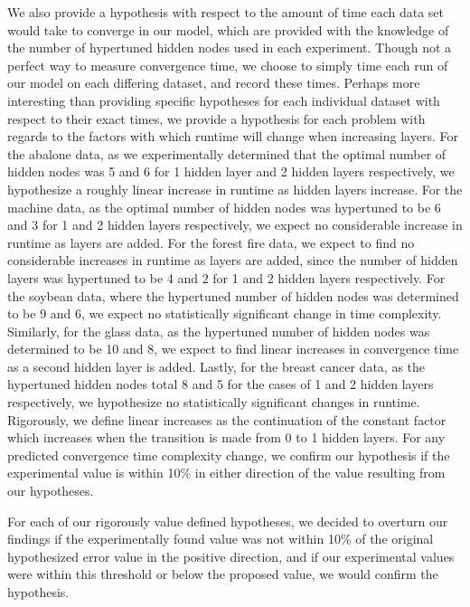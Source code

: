 \documentclass[twoside,11pt]{article}
\begin{document}
  We also provide a hypothesis with respect to the amount of time each data set would take to converge in our model, which are provided with the knowledge of
  the number of hypertuned hidden nodes used in each experiment. 
  Though not a perfect way to measure
  convergence time, we choose to simply time each run of our model on each differing dataset, and record these times. Perhaps more interesting than providing
  specific hypotheses for each individual dataset with respect to their exact times, we provide a hypothesis for each problem with regards to the factors with
  which runtime will change when increasing layers. For the abalone data, as we experimentally determined that the optimal number of hidden nodes was 5 and 6 for
  1 hidden layer and 2 hidden layers respectively, we hypothesize a roughly linear increase in runtime as hidden layers increase. For the machine data, as the optimal
  number of hidden nodes was hypertuned to be 6 and 3 for 1 and 2 hidden layers respectively, we expect no considerable increase in runtime as layers are added. For
  the forest fire data, we expect to find no considerable increases in runtime as layers are added, since the number of hidden layers was hypertuned to be
  4 and 2 for 1 and 2 hidden layers respectively. For the soybean data, where the hypertuned number of hidden nodes was determined to be 9 and 6, we expect no 
  statistically significant change in time complexity. Similarly, for the glass data, as the hypertuned number of hidden nodes was determined to be 10 and 8,
  we expect to find linear increases in convergence time as a second hidden layer is added. 
  Lastly, for the breast cancer data, as the hypertuned hidden nodes total 8 and 5 for the cases
  of 1 and 2 hidden layers respectively, we hypothesize no statistically significant changes in runtime. 
  Rigorously, we define linear increases as the continuation of the constant
  factor which increases when the transition is made from 0 to 1 hidden layers. For any predicted convergence time complexity
  change, we confirm our hypothesis if the experimental value is within 10\% in either direction of the value resulting from our hypotheses.

  For each of our rigorously value defined hypotheses, we decided to overturn our findings if the experimentally found value was not within 10\% of the original 
  hypothesized error value in the positive direction, and if our experimental values were within this threshold or below the proposed value, we would confirm the
  hypothesis.
\end{document}
